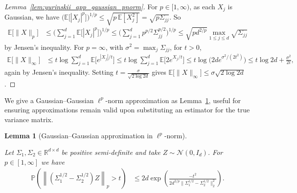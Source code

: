 \documentclass[11pt,lof]{puthesis}
\renewcommand{\P}{\ensuremath{\mathbb{P}}}
\newcommand{\R}{\ensuremath{\mathbb{R}}}
\newcommand{\E}{\ensuremath{\mathbb{E}}}
\newcommand{\cN}{\ensuremath{\mathcal{N}}}
\theoremstyle{break}
\newtheorem{lemma}{Lemma}[section]
\theoremstyle{proof}
\newtheorem{proof}{Proof}
\begin{document}
\begin{proof}[Lemma~\ref{lem:yurinskii_app_gaussian_pnorm}]

  For $p \in [1, \infty)$,
  as each $X_j$ is Gaussian, we have
  $\big(\E\big[|X_j|^p\big]\big)^{1/p}
  \leq \sqrt{p\, \E[X_j^2]}
  = \sqrt{p \Sigma_{j j}}$.
  So
  \begin{align*}
    \E\big[\|X\|_p\big]
    &\leq
    \Bigg(\sum_{j=1}^d \E \big[ |X_j|^p \big] \Bigg)^{1/p}
    \leq \Bigg(\sum_{j=1}^d p^{p/2} \Sigma_{j j}^{p/2} \Bigg)^{1/p}
    \leq \sqrt{p d^{2/p}}
    \max_{1\leq j\leq d}
    \sqrt{\Sigma_{j j}}
  \end{align*}
  by Jensen's inequality.
  For $p=\infty$,
  with $\sigma^2 = \max_j \Sigma_{j j}$,
  for $t>0$,
  \begin{align*}
    \E\big[\|X\|_\infty \big]
    &\leq
    t
    \log
    \sum_{j=1}^d
    \E\Big[
      e^{|X_j| / t}
    \Big]
    \leq
    t
    \log
    \sum_{j=1}^d
    \E\Big[
      2 e^{X_j / t}
    \Big]
    \leq t \log \Big(2 d e^{\sigma^2/(2t^2)}\Big)
    \leq t \log 2 d + \frac{\sigma^2}{2t},
  \end{align*}
  again by Jensen's inequality.
  Setting $t = \frac{\sigma}{\sqrt{2 \log 2d}}$ gives
  $\E\big[\|X\|_\infty \big] \leq \sigma \sqrt{2 \log 2d}$.
\end{proof}

We give a Gaussian--Gaussian $\ell^p$-norm approximation
as Lemma~\ref{lem:yurinskii_app_feasible_gaussian}, useful for
ensuring approximations remain valid upon substituting
an estimator for the true variance matrix.

\begin{lemma}[Gaussian--Gaussian approximation in
  \texorpdfstring{$\ell^p$}{lp}-norm]%
  \label{lem:yurinskii_app_feasible_gaussian}

  Let $\Sigma_1, \Sigma_2 \in \R^{d \times d}$ be positive semi-definite
  and take $Z \sim \cN(0, I_d)$.
  For $p \in [1, \infty]$ we have
  \begin{align*}
    \P\left(
      \left\|
      \left(\Sigma_1^{1/2} - \Sigma_2^{1/2}\right) Z
      \right\|_p
      > t
    \right)
    &\leq
    2 d \exp \left(
      \frac{-t^2}
      {2 d^{2/p} \big\|\Sigma_1^{1/2} - \Sigma_2^{1/2}\big\|_2^2}
    \right).
  \end{align*}

\end{lemma}
\end{document}
